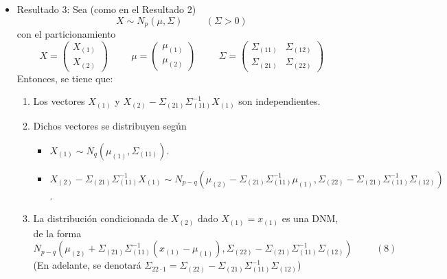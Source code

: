 \documentclass[11pt,a4paper]{article}
\begin{document}
\begin{itemize}
\begin{itemize}
\item Resultado 3: Sea (como en el Resultado 2)
$$X \sim N_{p}(\mu, \Sigma) \hspace{1cm} (\Sigma > 0)$$
con el particionamiento
$$X = \begin{pmatrix} X_{(1)} \\ X_{(2)} \end{pmatrix} \hspace{1cm} \mu = \begin{pmatrix} \mu_{(1)} \\ \mu_{(2)} \end{pmatrix} \hspace{1cm} \Sigma = \begin{pmatrix}
\Sigma_{(11)} & \Sigma_{(12)} \\
\Sigma_{(21)} & \Sigma_{(22)}
\end{pmatrix}$$
Entonces, se tiene que:
\begin{enumerate}
\item Los vectores $X_{(1)}$ y $X_{(2)} - \Sigma_{(21)}\Sigma_{(11)}^{-1}X_{(1)}$ son independientes.
\item Dichos vectores se distribuyen según
\begin{itemize}
\item $X_{(1)} \sim N_{q}(\mu_{(1)}, \Sigma_{(11)})$.
\item $X_{(2)} - \Sigma_{(21)}\Sigma_{(11)}^{-1}X_{(1)} \sim N_{p-q} (\mu_{(2)} - \Sigma_{(21)}\Sigma_{(11)}^{-1}\mu_{(1)}, \Sigma_{(22)} - \Sigma_{(21)}\Sigma_{(11)}^{-1}\Sigma_{(12)})$.
\end{itemize}
\item La distribución condicionada de $X_{(2)}$ dado $X_{(1)} = x_{(1)}$ es una DNM, de la forma
$$N_{p-q}(\mu_{(2)} + \Sigma_{(21)}\Sigma_{(11)}^{-1}(x_{(1)} - \mu_{(1)}), \Sigma_{(22)} - \Sigma_{(21)}\Sigma_{(11)}^{-1}\Sigma_{(12)}) \hspace{1cm} (8)$$
(En adelante, se denotará $\Sigma_{22 \cdot 1} = \Sigma_{(22)} - \Sigma_{(21)}\Sigma_{(11)}^{-1}\Sigma_{(12)}$)
\end{enumerate}


\end{itemize}
\end{itemize}
\end{document}

